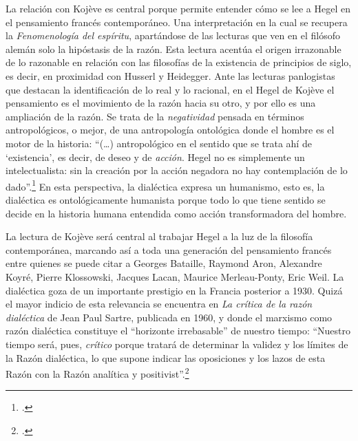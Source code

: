La relación con Kojève es central porque permite entender cómo se lee a
Hegel en el pensamiento francés contemporáneo. Una interpretación en la
cual se recupera la \emph{Fenomenología del espíritu}, apartándose de
las lecturas que ven en el filósofo alemán solo la hipóstasis de la
razón. Esta lectura acentúa el origen irrazonable de lo razonable en
relación con las filosofías de la existencia de principios de siglo, es
decir, en proximidad con Husserl y Heidegger. Ante las lecturas
panlogistas que destacan la identificación de lo real y lo racional, en
el Hegel de Kojève el pensamiento es el movimiento de la razón hacia su
otro, y por ello es una ampliación de la razón. Se trata de la
\emph{negatividad} pensada en términos antropológicos, o mejor, de una
antropología ontológica donde el hombre es el motor de la historia:
\enquote{(\dots) antropológico en el sentido que se trata ahí de
\enquote{existencia}, es decir, de deseo y de \emph{acción}. Hegel no es
simplemente un intelectualista: sin la creación por la acción negadora
no hay contemplación de lo dado}.\footcite[53]{kojeve1996} En esta perspectiva, la dialéctica expresa un
humanismo, esto es, la dialéctica es ontológicamente humanista porque
todo lo que tiene sentido se decide en la historia humana entendida como
acción transformadora del hombre.

La lectura de Kojève será central al trabajar Hegel a la luz de la
filosofía contemporánea, marcando así a toda una generación del
pensamiento francés entre quienes se puede citar a Georges Bataille,
Raymond Aron, Alexandre Koyré, Pierre Klossowski, Jacques Lacan, Maurice
Merleau-Ponty, Eric Weil. La dialéctica goza de un importante prestigio
en la Francia posterior a 1930. Quizá el mayor indicio de esta
relevancia se encuentra en \emph{La crítica de la razón dialéctica} de
Jean Paul Sartre, publicada en 1960, y donde el marxismo como razón
dialéctica constituye el \enquote{horizonte irrebasable} de nuestro tiempo:
\enquote{Nuestro tiempo será, pues, \emph{crítico} porque tratará de determinar
la validez y los límites de la Razón dialéctica, lo que supone indicar
las oposiciones y los lazos de esta Razón con la Razón analítica y
positivist}.\footcite[11]{sartre1995}

